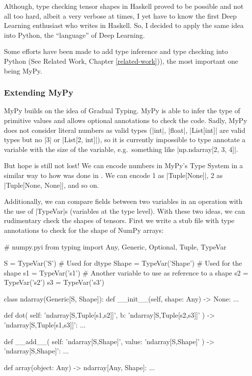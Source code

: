 Although, type checking tensor shapes in Haskell proved to be possible
and not all too hard, albeit a very verbose at times, I yet have to know
the first Deep Learning enthusiast who writes in Haskell. So, I decided
to apply the same idea into Python, the \enquote{language} of Deep
Learning.

Some efforts have been made to add type inference and type checking into
Python (See Related Work, Chapter \ref{related-work})), the most
important one being MyPy.

\subsubsection*{Extending MyPy}

MyPy builds on the idea of Gradual Typing. MyPy is able to infer the
type of primitive values and allows optional annotations to check the
code. Sadly, MyPy does not consider literal numbers as valid types
(\pycode|int|, \pycode|float|, \pycode|List[int]| are valid types
but no \pycode|3| or \pycode|List[2, int]|), so it is currently
impossible to type annotate a variable with the size of the variable,
e.g.~something like \pycode|np.ndarray[2, 3, 4]|.

But hope is still not lost! We can encode numbers in MyPy's Type System
in a similar way to how was done in
\autocites{chen_typesafe_2017}{eaton_statically_2006}. We can encode 1
as \pycode|Tuple[None]|, 2 as \pycode|Tuple[None, None]|, and
so on.

Additionally, we can compare fields between two variables in an
operation with the use of \pycode|TypeVar|s (variables at the type
level). With these two ideas, we can rudimentary check the shapes of
tensors. First we write a stub file \autocite{pep484} with type
annotations to check for the shape of NumPy arrays:

\begin{pythoncode}
# numpy.pyi
from typing import Any, Generic, Optional, Tuple, TypeVar

S = TypeVar('S')  # Used for dtype
Shape = TypeVar('Shape')  # Used for the shape
s1 = TypeVar('s1')  # Another variable to use as reference to a shape
s2 = TypeVar('s2')
s3 = TypeVar('s3')


class ndarray(Generic[S, Shape]):
    def __init__(self, shape: Any) -> None: ...

    def dot(
            self: 'ndarray[S,Tuple[s1,s2]]',
            b: 'ndarray[S,Tuple[s2,s3]]'
    ) -> 'ndarray[S,Tuple[s1,s3]]': ...

    def __add__(
            self: 'ndarray[S,Shape]',
            value: 'ndarray[S,Shape]'
    ) -> 'ndarray[S,Shape]': ...


def array(object: Any) -> ndarray[Any, Shape]: ...
\end{pythoncode}

